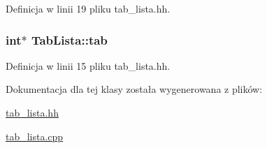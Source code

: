 Definicja w linii 19 pliku tab\-\_\-lista.\-hh.

\hypertarget{class_tab_lista_a06f658ed62f3db852813e90dcc5876a5}{
\subsubsection[{tab}]{\setlength{\rightskip}{0pt plus 5cm}int$\ast$ Tab\-Lista\-::tab\hspace{0.3cm}{\ttfamily [private]}}}\label{class_tab_lista_a06f658ed62f3db852813e90dcc5876a5}


Definicja w linii 15 pliku tab\-\_\-lista.\-hh.



Dokumentacja dla tej klasy została wygenerowana z plików\-:\begin{DoxyCompactItemize}
\item 
\hyperlink{tab__lista_8hh}{tab\-\_\-lista.\-hh}\item 
\hyperlink{tab__lista_8cpp}{tab\-\_\-lista.\-cpp}\end{DoxyCompactItemize}

